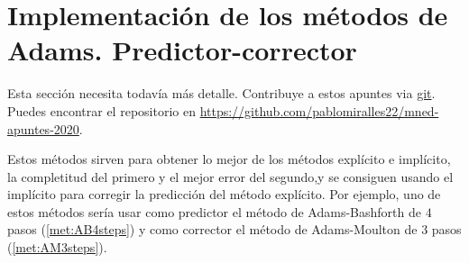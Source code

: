 \section{Implementación de los métodos de Adams. Predictor-corrector}

\begin{editorial}
    Esta sección necesita todavía más detalle.
    Contribuye a estos apuntes via \href{https://git-scm.com/}{git}.
    Puedes encontrar el repositorio en
    \url{https://github.com/pablomiralles22/mned-apuntes-2020}.
\end{editorial}

Estos métodos sirven para obtener lo mejor de los métodos explícito e implícito,
la completitud del primero y el mejor error del segundo,y se consiguen usando
el implícito para corregir la predicción del método explícito. Por ejemplo,
uno de estos métodos  sería usar como predictor el método de Adams-Bashforth 
de $4$ pasos (\cref{met:AB4steps}) y como corrector el método de Adams-Moulton
de $3$ pasos (\cref{met:AM3steps}).

